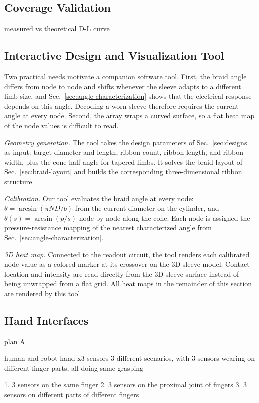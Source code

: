 \documentclass[letterpaper, 10 pt, conference]{ieeeconf}  %
\begin{document}
\subsection{Coverage Validation}
measured vs theoretical D-L curve

\subsection{Interactive Design and Visualization Tool}\label{sec:tool}
Two practical needs motivate a companion software tool. First, the braid angle differs from node to node and shifts whenever the sleeve adapts to a different limb size, and Sec.~\ref{sec:angle-characterization} shows that the electrical response depends on this angle. Decoding a worn sleeve therefore requires the current angle at every node. Second, the array wraps a curved surface, so a flat heat map of the node values is difficult to read.

\emph{Geometry generation.} The tool takes the design parameters of Sec.~\ref{sec:designs} as input: target diameter and length, ribbon count, ribbon length, and ribbon width, plus the cone half-angle for tapered limbs. It solves the braid layout of Sec.~\ref{sec:braid-layout} and builds the corresponding three-dimensional ribbon structure.

\emph{Calibration.} Our tool evaluates the braid angle at every node: $\theta = \arcsin(\pi N D / b)$ from the current diameter on the cylinder, and $\theta(s) = \arcsin(p/s)$ node by node along the cone. Each node is assigned the pressure-resistance mapping of the nearest characterized angle from Sec.~\ref{sec:angle-characterization}. 

\emph{3D heat map.} Connected to the readout circuit, the tool renders each calibrated node value as a colored marker at its crossover on the 3D sleeve model. Contact location and intensity are read directly from the 3D sleeve surface instead of being unwrapped from a flat grid. All heat maps in the remainder of this section are rendered by this tool.

\subsection{Hand Interfaces}

plan A

human and robot hand x3 sensors
3 different scenarios, with 3 sensors wearing on different finger parts, all doing same grasping 

1. 3 sensors on the same finger
2. 3 sensors on the proximal joint of fingers
3. 3 sensors on different parts of different fingers
\end{document}
